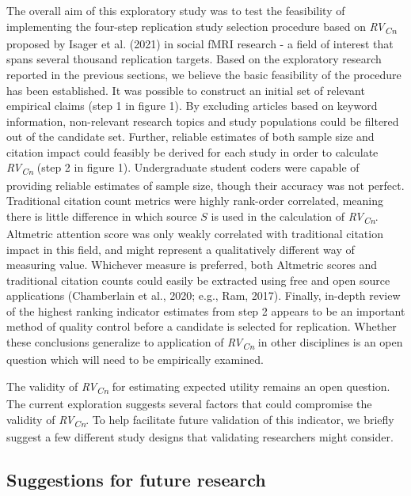 \documentclass[
  english,
  man,floatsintext]{apa6}
\begin{document}
The overall aim of this exploratory study was to test the feasibility of implementing the four-step replication study selection procedure based on \emph{RV\textsubscript{Cn}} proposed by Isager et al. (2021) in social fMRI research - a field of interest that spans several thousand replication targets. Based on the exploratory research reported in the previous sections, we believe the basic feasibility of the procedure has been established. It was possible to construct an initial set of relevant empirical claims (step 1 in figure 1). By excluding articles based on keyword information, non-relevant research topics and study populations could be filtered out of the candidate set. Further, reliable estimates of both sample size and citation impact could feasibly be derived for each study in order to calculate \emph{RV\textsubscript{Cn}} (step 2 in figure 1). Undergraduate student coders were capable of providing reliable estimates of sample size, though their accuracy was not perfect. Traditional citation count metrics were highly rank-order correlated, meaning there is little difference in which source \(S\) is used in the calculation of \emph{RV\textsubscript{Cn}}. Altmetric attention score was only weakly correlated with traditional citation impact in this field, and might represent a qualitatively different way of measuring value. Whichever measure is preferred, both Altmetric scores and traditional citation counts could easily be extracted using free and open source applications (Chamberlain et al., 2020; e.g., Ram, 2017). Finally, in-depth review of the highest ranking indicator estimates from step 2 appears to be an important method of quality control before a candidate is selected for replication. Whether these conclusions generalize to application of \emph{RV\textsubscript{Cn}} in other disciplines is an open question which will need to be empirically examined.

The validity of \emph{RV\textsubscript{Cn}} for estimating expected utility remains an open question. The current exploration suggests several factors that could compromise the validity of \emph{RV\textsubscript{Cn}}. To help facilitate future validation of this indicator, we briefly suggest a few different study designs that validating researchers might consider.

\hypertarget{suggestions-for-future-research}{%
\subsection{Suggestions for future research}\label{suggestions-for-future-research}}
\end{document}

